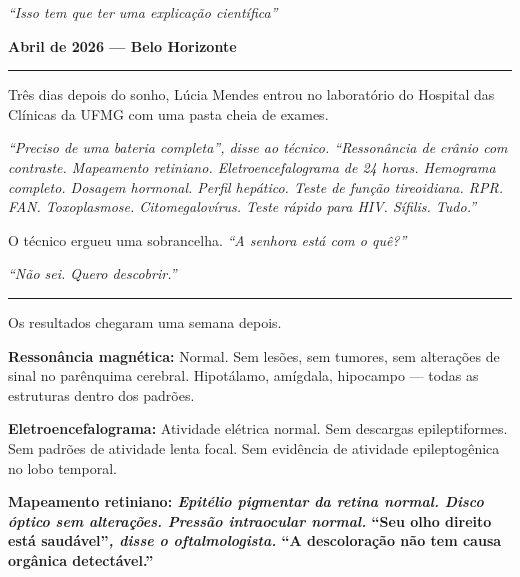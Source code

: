 
\noindent \textit{\textquotedblleft{}Isso tem que ter uma explicação científica\textquotedblright{}}

\noindent \textbf{Abril de 2026 --- Belo Horizonte}

\vspace{0.5em}\noindent\rule{\textwidth}{0.5pt}\vspace{0.5em}

\noindent Três dias depois do sonho, Lúcia Mendes entrou no laboratório do Hospital das Clínicas da UFMG com uma pasta cheia de exames.

\noindent \textit{\textquotedblleft{}Preciso de uma bateria completa\textquotedblright{}\textit{, disse ao técnico. }\textquotedblleft{}Ressonância de crânio com contraste. Mapeamento retiniano. Eletroencefalograma de 24 horas. Hemograma completo. Dosagem hormonal. Perfil hepático. Teste de função tireoidiana. RPR. FAN. Toxoplasmose. Citomegalovírus. Teste rápido para HIV. Sífilis. Tudo.\textquotedblright{}}

\noindent O técnico ergueu uma sobrancelha. \textit{\textquotedblleft{}A senhora está com o quê?\textquotedblright{}}

\noindent \textit{\textquotedblleft{}Não sei. Quero descobrir.\textquotedblright{}}

\vspace{0.5em}\noindent\rule{\textwidth}{0.5pt}\vspace{0.5em}

\noindent Os resultados chegaram uma semana depois.

\noindent \textbf{Ressonância magnética:} Normal. Sem lesões, sem tumores, sem alterações de sinal no parênquima cerebral. Hipotálamo, amígdala, hipocampo --- todas as estruturas dentro dos padrões.

\noindent \textbf{Eletroencefalograma:} Atividade elétrica normal. Sem descargas epileptiformes. Sem padrões de atividade lenta focal. Sem evidência de atividade epileptogênica no lobo temporal.

\noindent \textbf{Mapeamento retiniano:\textit{ Epitélio pigmentar da retina normal. Disco óptico sem alterações. Pressão intraocular normal. }\textquotedblleft{}Seu olho direito está saudável\textquotedblright{}\textit{, disse o oftalmologista. }\textquotedblleft{}A descoloração não tem causa orgânica detectável.\textquotedblright{}}

